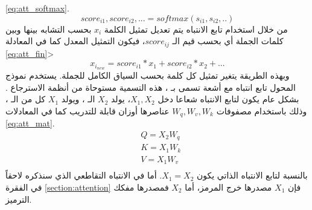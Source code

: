 \ref{eq:att_softmax}.
\begin{equation}
score_{i1},score_{i2},... = softmax(s_{i1},s_{i2},..)
\label{eq:att_softmax}
\end{equation}
من خلال استخدام تابع الانتباه يتم تعديل تمثيل الكلمة $x_i$  بحسب التشابه بينها وبين كلمات الجملة أي بحسب قيم الـ $score_{ij}$، فيكون التمثيل المعدل كما في المعادلة 
\ref{eq:att_fin}>
\begin{equation}
x_{i_{new}} = score_{i1}*x_1+score_{i2}*x_2+...
\label{eq:att_fin}
\end{equation}
وبهذه الطريقة يتغير تمثيل كل كلمة بحسب السياق الكامل للجملة. 
\newline
يستخدم نموذج المحول تابع انتباه مع أشعة تسمى بـ
،
هذه التسمية مستوحاة من أنظمة الاسترجاع
.
بشكل عام يكون لتابع الانتباه  شعاعا دخل
$X_1,X_2$،
يولد
$X_2$
الـ
،
ويولد
$X_1$
كل من الـ
،
وذلك باستخدام مصفوفات
$W_q,W_v,W_k$
عناصرها أوزان قابلة للتدريب كما في المعادلات 
\ref{eq:att_mat}.
\begin{equation}
\begin{split}
&Q = X_2 W_q\\
&K = X_1 W_k\\
&V = X_1 W_v\\
\end{split}
\label{eq:att_mat}
\end{equation}
بالنسبة لتابع الانتباه الذاتي يكون
$X_1 = X_2$.
أما في الانتباه التقاطعي الذي سنذكره لاحقاً في الفقرة
\ref{section:attention}
فإن
$X_1$
مصدرها خرج المرمز، أما
$X_2$
فمصدرها مفكك الترميز.
